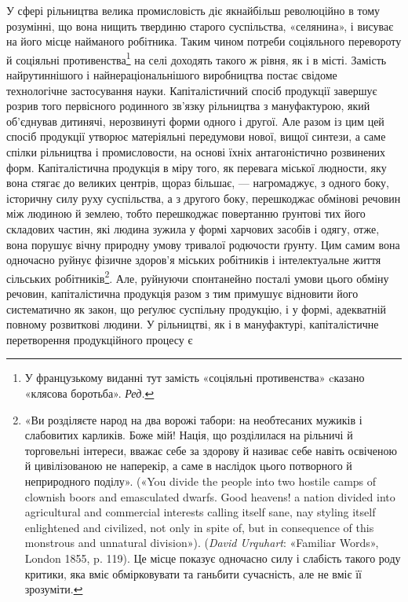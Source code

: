 У сфері рільництва велика промисловість діє якнайбільш
революційно в тому розумінні, що вона нищить твердиню старого
суспільства, «селянина», і висуває на його місце найманого робітника.
Таким чином потреби соціяльного перевороту й соціяльні
противенства\footnote*{
У французькому виданні тут замість «соціяльні противенства»
cказано «клясова боротьба». \emph{Ред.}
} на селі доходять такого ж рівня, як і в місті.
Замість найрутиннішого і найнераціональнішого виробництва
постає свідоме технологічне застосування науки. Капіталістичний
спосіб продукції завершує розрив того первісного родинного
зв’язку рільництва з мануфактурою, який об’єднував дитинячі,
нерозвинуті форми одного і другої. Але разом із цим цей спосіб
продукції утворює матеріяльні передумови нової, вищої
синтези, а саме спілки рільництва і промисловости, на основі
їхніх антагоністично розвинених форм. Капіталістична продукція
в міру того, як перевага міської людности, яку вона стягає до
великих центрів, щораз більшає, — нагромаджує, з одного боку,
історичну силу руху суспільства, а з другого боку, перешкоджає
обмінові речовин між людиною й землею, тобто перешкоджає
повертанню ґрунтові тих його складових частин, які людина
зужила у формі харчових засобів і одягу, отже, вона порушує
вічну природну умову тривалої родючости ґрунту. Цим самим
вона одночасно руйнує фізичне здоров’я міських робітників і
інтелектуальне життя сільських робітників\footnote{
«Ви розділяєте народ на два ворожі табори: на необтесаних мужиків
і слабовитих карликів. Боже мій! Нація, що розділилася на рільничі
й торговельні інтереси, вважає себе за здорову й називає себе
навіть освіченою й цивілізованою не наперекір, а саме в наслідок цього
потворного й неприродного поділу». («You divide the people into two
hostile camps of clownish boors and emasculated dwarfs. Good heavens!
a nation divided into agricultural and commercial interests calling itself
sane, nay styling itself enlightened and civilized, not only in spite of,
but in consequence of this monstrous and unnatural division»). (\emph{David
Urquhart}: «Familiar Words», London 1855, p. 119). Це місце показує
одночасно силу і слабість такого роду критики, яка вміє обмірковувати
та ганьбити сучасність, але не вміє її зрозуміти.
}.  Але, руйнуючи
спонтанейно посталі умови цього обміну речовин, капіталістична
продукція разом з тим примушує відновити його систематично
як закон, що реґулює суспільну продукцію, і у формі, адекватній
повному розвиткові людини. У рільництві, як і в мануфактурі,
капіталістичне перетворення продукційного процесу є
